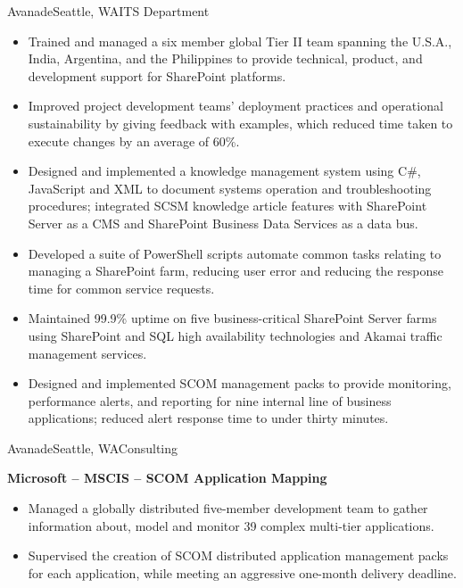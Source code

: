 \documentclass[11pt,letter,roman]{moderncv}
\begin{document}
{Avanade}{Seattle, WA}{ITS Department}{%
  \begin{itemize}
    \item Trained and managed a six member global Tier II team spanning the
      U.S.A., India, Argentina, and the Philippines to provide technical,
      product, and development support for SharePoint platforms.
    \item Improved project development teams' deployment practices and
      operational sustainability by giving feedback with examples, which
      reduced time taken to execute changes by an average of 60\%.
    \item Designed and implemented a knowledge management system using C\#,
      JavaScript and XML to document systems operation and troubleshooting
      procedures; integrated SCSM knowledge article features with SharePoint
      Server as a CMS and SharePoint Business Data Services as a data bus.
    \item Developed a suite of PowerShell scripts automate common tasks
      relating to managing a SharePoint farm, reducing user error and reducing
      the response time for common service requests.
    \item Maintained 99.9\% uptime on five business-critical SharePoint
      Server farms using SharePoint and SQL high availability technologies and
      Akamai traffic management services.
    \item Designed and implemented SCOM management packs to provide
      monitoring, performance alerts, and reporting for nine internal line of
      business applications; reduced alert response time to
      under thirty minutes.
  \end{itemize}
}
{Avanade}{Seattle, WA}{Consulting}{%
  \textbf{Microsoft -- MSCIS -- SCOM Application Mapping}
  \begin{itemize}
    \item Managed a globally distributed five-member development team to
      gather information about, model and monitor 39 complex multi-tier
      applications.
    \item Supervised the creation of SCOM distributed application management
      packs for each application, while meeting an aggressive
      one-month delivery deadline.
  \end{itemize}
}
\end{document}
